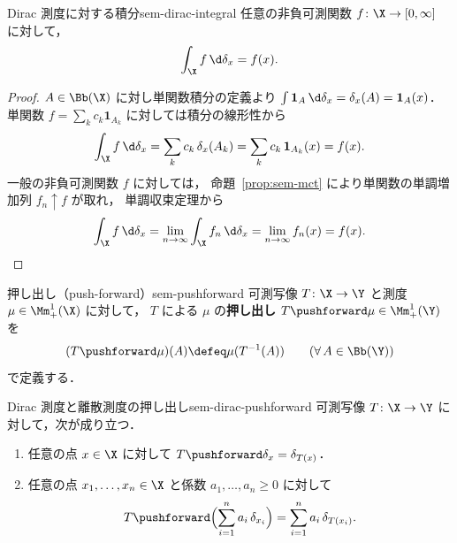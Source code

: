 \begin{claim}{Dirac 測度に対する積分}{sem-dirac-integral}
  任意の非負可測関数 $f \colon \X \to [0, \infty]$ に対して，
  \[
    \int_\X f \, \d\delta_x = f(x).
  \]
\end{claim}

\begin{proof}
  $A \in \Bb(\X)$ に対し単関数積分の定義より
  $\int \mathbf{1}_A \, \d\delta_x = \delta_x(A) = \mathbf{1}_A(x)$．
  単関数 $f = \sum_k c_k \mathbf{1}_{A_k}$ に対しては積分の線形性から
  \[
    \int_\X f \, \d\delta_x
    = \sum_k c_k \, \delta_x(A_k)
    = \sum_k c_k \, \mathbf{1}_{A_k}(x)
    = f(x).
  \]
  一般の非負可測関数 $f$ に対しては，
  命題~\ref{prop:sem-mct} により単関数の単調増加列 $f_n \uparrow f$ が取れ，
  単調収束定理から
  \[
    \int_\X f \, \d\delta_x
    = \lim_{n \to \infty} \int_\X f_n \, \d\delta_x
    = \lim_{n \to \infty} f_n(x)
    = f(x).
  \]
\end{proof}

\begin{definition}{押し出し（push-forward）}{sem-pushforward}
  可測写像 $T \colon \X \to \Y$ と測度 $\mu \in \Mm_+^1(\X)$ に対して，
  $T$ による $\mu$ の\textbf{押し出し} $T\pushforward \mu \in \Mm_+^1(\Y)$ を
  \[
    (T\pushforward \mu)(A) \defeq \mu(T^{-1}(A))
    \qquad (\forall\, A \in \Bb(\Y))
  \]
  で定義する．
\end{definition}

\begin{proposition}{Dirac 測度と離散測度の押し出し}{sem-dirac-pushforward}
  可測写像 $T \colon \X \to \Y$ に対して，次が成り立つ．
  \begin{enumerate}
    \item[(i)] 任意の点 $x \in \X$ に対して
      $T\pushforward \delta_x = \delta_{T(x)}$．
    \item[(ii)] 任意の点 $x_1, \ldots, x_n \in \X$ と係数
      $a_1, \ldots, a_n \geq 0$ に対して
      \[
        T\pushforward \Bigl(\sum_{i=1}^{n} a_i\, \delta_{x_i}\Bigr)
        = \sum_{i=1}^{n} a_i\, \delta_{T(x_i)}.
      \]
  \end{enumerate}
\end{proposition}

